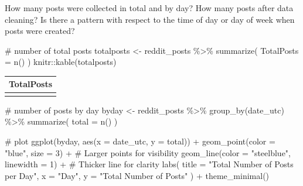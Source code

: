 \documentclass[
  letterpaper,
  DIV=11,
  numbers=noendperiod]{scrartcl}
\newenvironment{Shaded}{\begin{snugshade}}{\end{snugshade}}
\newcommand{\AttributeTok}[1]{\textcolor[rgb]{0.40,0.45,0.13}{#1}}
\newcommand{\CommentTok}[1]{\textcolor[rgb]{0.37,0.37,0.37}{#1}}
\newcommand{\DecValTok}[1]{\textcolor[rgb]{0.68,0.00,0.00}{#1}}
\newcommand{\FunctionTok}[1]{\textcolor[rgb]{0.28,0.35,0.67}{#1}}
\newcommand{\NormalTok}[1]{\textcolor[rgb]{0.00,0.23,0.31}{#1}}
\newcommand{\OtherTok}[1]{\textcolor[rgb]{0.00,0.23,0.31}{#1}}
\newcommand{\SpecialCharTok}[1]{\textcolor[rgb]{0.37,0.37,0.37}{#1}}
\newcommand{\StringTok}[1]{\textcolor[rgb]{0.13,0.47,0.30}{#1}}
\begin{document}
How many posts were collected in total and by day? How many posts after
data cleaning? Is there a pattern with respect to the time of day or day
of week when posts were created?

\begin{Shaded}
\begin{Highlighting}[]
\CommentTok{\# number of total posts}
\NormalTok{totalposts }\OtherTok{\textless{}{-}}\NormalTok{ reddit\_posts }\SpecialCharTok{\%\textgreater{}\%}
  \FunctionTok{summarize}\NormalTok{(}
    \AttributeTok{TotalPosts =} \FunctionTok{n}\NormalTok{()}
\NormalTok{  )}
\NormalTok{knitr}\SpecialCharTok{::}\FunctionTok{kable}\NormalTok{(totalposts)}
\end{Highlighting}
\end{Shaded}

\begin{longtable}[]{@{}r@{}}
\toprule\noalign{}
TotalPosts \\
\midrule\noalign{}
\endhead
\bottomrule\noalign{}
\endlastfoot
557 \\
\end{longtable}

\begin{Shaded}
\begin{Highlighting}[]
\CommentTok{\# number of posts by day}
\NormalTok{byday }\OtherTok{\textless{}{-}}\NormalTok{ reddit\_posts }\SpecialCharTok{\%\textgreater{}\%}
  \FunctionTok{group\_by}\NormalTok{(date\_utc) }\SpecialCharTok{\%\textgreater{}\%}
  \FunctionTok{summarize}\NormalTok{(}
    \AttributeTok{total =} \FunctionTok{n}\NormalTok{()}
\NormalTok{  )}

\CommentTok{\# plot}
\FunctionTok{ggplot}\NormalTok{(byday, }\FunctionTok{aes}\NormalTok{(}\AttributeTok{x =}\NormalTok{ date\_utc, }\AttributeTok{y =}\NormalTok{ total)) }\SpecialCharTok{+} 
  \FunctionTok{geom\_point}\NormalTok{(}\AttributeTok{color =} \StringTok{"blue"}\NormalTok{, }\AttributeTok{size =} \DecValTok{3}\NormalTok{) }\SpecialCharTok{+}  \CommentTok{\# Larger points for visibility}
  \FunctionTok{geom\_line}\NormalTok{(}\AttributeTok{color =} \StringTok{"steelblue"}\NormalTok{, }\AttributeTok{linewidth =} \DecValTok{1}\NormalTok{) }\SpecialCharTok{+}  \CommentTok{\# Thicker line for clarity}
  \FunctionTok{labs}\NormalTok{(}
    \AttributeTok{title =} \StringTok{"Total Number of Posts per Day"}\NormalTok{,}
    \AttributeTok{x =} \StringTok{"Day"}\NormalTok{,}
    \AttributeTok{y =} \StringTok{"Total Number of Posts"}
\NormalTok{  ) }\SpecialCharTok{+}
  \FunctionTok{theme\_minimal}\NormalTok{()}
\end{Highlighting}
\end{Shaded}
\end{document}

